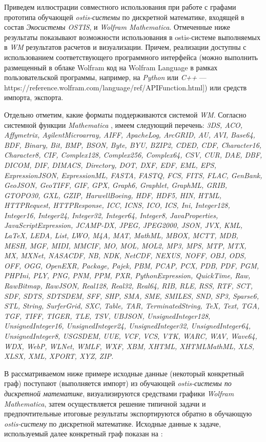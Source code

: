 Приведем иллюстрации совместного использования при работе с графами прототипа обучающей \textit{ostis-системы} по дискретной математике, входящей в состав \textit{Экосистемы OSTIS}, и \textit{Wolfram Mathematica}. Отмеченные ниже результаты показывают возможности использования в ostis-системе выполняемых в \textit{WM} результатов расчетов и визуализации. Причем, реализации доступны с использованием соответствующего программного интерфейса (можно выполнить размещенный в облаке Wolfram код на Wolfram Language в рамках пользовательской программы, например, на \textit{Python} или \textit{C++} --- https://reference.wolfram.com/language/ref/APIFunction.html]) или средств импорта, экспорта. 

Отдельно отметим, какие форматы поддерживаются системой \textit{WM}. Согласно системной функции \textit{Mathematica} , имеем следующий перечень:
\textit{3DS, ACO, Affymetrix, AgilentMicroarray, AIFF, ApacheLog, ArcGRID, AU, AVI, Base64, BDF, Binary, Bit, BMP, BSON, Byte, BYU, BZIP2, CDED, CDF, Character16, Character8, CIF, Complex128, Complex256, Complex64, CSV, CUR, DAE, DBF, DICOM, DIF, DIMACS, Directory, DOT, DXF, EDF, EML, EPS, ExpressionJSON, ExpressionML, FASTA, FASTQ, FCS, FITS, FLAC, GenBank, GeoJSON, GeoTIFF, GIF, GPX, Graph6, Graphlet, GraphML, GRIB, GTOPO30, GXL, GZIP, HarwellBoeing, HDF, HDF5, HIN, HTML, HTTPRequest, HTTPResponse, ICC, ICNS, ICO, ICS, Ini, Integer128, Integer16, Integer24, Integer32, Integer64, Integer8, JavaProperties, JavaScriptExpression, JCAMP-DX, JPEG, JPEG2000, JSON, JVX, KML, LaTeX, LEDA, List, LWO, M4A, MAT, MathML, MBOX, MCTT, MDB, MESH, MGF, MIDI, MMCIF, MO, MOL, MOL2, MP3, MPS, MTP, MTX, MX, MXNet, NASACDF, NB, NDK, NetCDF, NEXUS, NOFF, OBJ, ODS, OFF, OGG, OpenEXR, Package, Pajek, PBM, PCAP, PCX, PDB, PDF, PGM, PHPIni, PLY, PNG, PNM, PPM, PXR, PythonExpression, QuickTime, Raw, RawBitmap, RawJSON, Real128, Real32, Real64, RIB, RLE, RSS, RTF, SCT, SDF, SDTS, SDTSDEM, SFF, SHP, SMA, SME, SMILES, SND, SP3, Sparse6, STL, String, SurferGrid, SXC, Table, TAR, TerminatedString, TeX, Text, TGA, TGF, TIFF, TIGER, TLE, TSV, UBJSON, UnsignedInteger128, UnsignedInteger16, UnsignedInteger24, UnsignedInteger32, UnsignedInteger64, UnsignedInteger8, USGSDEM, UUE, VCF, VCS, VTK, WARC, WAV, Wave64, WDX, WebP, WLNet, WMLF, WXF, XBM, XHTML, XHTMLMathML, XLS, XLSX, XML, XPORT, XYZ, ZIP.}

В рассматриваемом ниже примере исходные данные (некоторый конкретный граф) поступают (выполняется импорт) из обучающей \textit{ostis-системы по дискретной математике}, визуализируются средствами графики \textit{Wolfram Mathematica}, затем осуществляется решение типичной задачи и предпочтительные итоговые результаты экспортируются обратно в обучающую \textit{ostis-систему} по дискретной математике. Исходные данные к задаче, используемый далее конкретный граф показан на \textit{}:

